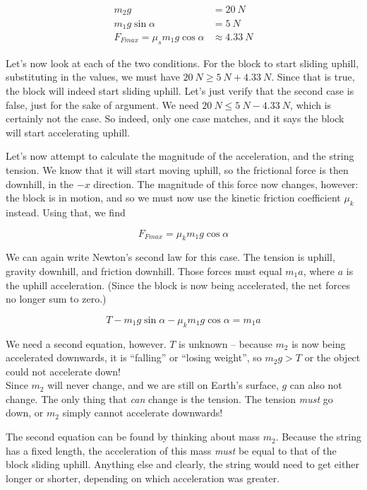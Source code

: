 \documentclass[8.01x]{subfiles}
\begin{document}
\begin{align}
m_2 g &= \SI{20}{N}\\
m_1 g \sin \alpha &= \SI{5}{N}\\
F_{Fmax} = \mu_s m_1 g \cos \alpha &\approx \SI{4.33}{N}
\end{align}

Let's now look at each of the two conditions. For the block to start sliding uphill, substituting in the values, we must have $\SI{20}{N} \ge \SI{5}{N} + \SI{4.33}{N}$. Since that is true, the block will indeed start sliding uphill. Let's just verify that the second case is false, just for the sake of argument. We need $\SI{20}{N} \le \SI{5}{N} - \SI{4.33}{N}$, which is certainly not the case. So indeed, only one case matches, and it says the block will start accelerating uphill.

Let's now attempt to calculate the magnitude of the acceleration, and the string tension. We know that it will start moving uphill, so the frictional force is then downhill, in the $-x$ direction. The magnitude of this force now changes, however: the block is in motion, and so we must now use the kinetic friction coefficient $\mu_k$ instead. Using that, we find

\begin{equation}
F_{Fmax} = \mu_k m_1 g \cos \alpha
\end{equation}

We can again write Newton's second law for this case. The tension is uphill, gravity downhill, and friction downhill. Those forces must equal $m_1 a$, where $a$ is the uphill acceleration. (Since the block is now being accelerated, the net forces no longer sum to zero.)

\begin{equation}
T - m_1 g \sin \alpha - \mu_k m_1 g \cos \alpha = m_1 a
\end{equation}

We need a second equation, however. $T$ is unknown -- because $m_2$ is now being accelerated downwards, it is ``falling'' or ``losing weight'', so $m_2 g > T$ or the object could not accelerate down!\\
Since $m_2$ will never change, and we are still on Earth's surface, $g$ can also not change. The only thing that \emph{can} change is the tension. The tension \emph{must} go down, or $m_2$ simply cannot accelerate downwards!

The second equation can be found by thinking about mass $m_2$. Because the string has a fixed length, the acceleration of this mass \emph{must} be equal to that of the block sliding uphill. Anything else and clearly, the string would need to get either longer or shorter, depending on which acceleration was greater.
\end{document}
